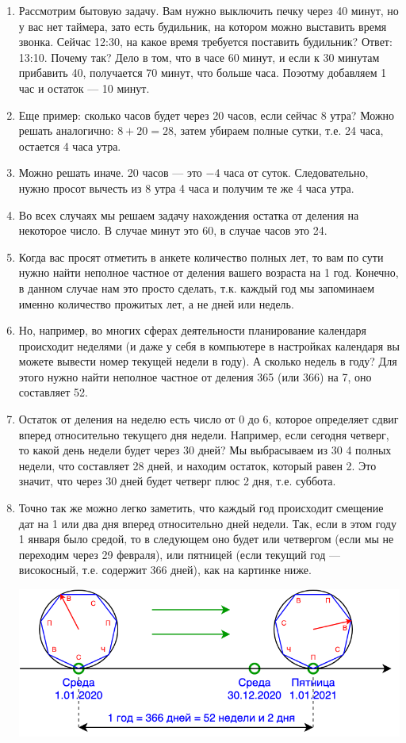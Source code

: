 \begin{enumerate}\setlength{\itemsep}{1pt}
\item Рассмотрим бытовую задачу. Вам нужно выключить печку через 40 минут, но у вас нет таймера, зато есть будильник, на котором можно выставить время звонка. Сейчас 12:30, на какое время требуется поставить будильник? Ответ: 13:10. Почему так? Дело в том, что в часе 60 минут, и если к 30 минутам прибавить 40, получается 70 минут, что больше часа. Поэотму добавляем 1 час и остаток --- 10 минут.
\item Еще пример: сколько часов будет через 20 часов, если сейчас 8 утра? Можно решать аналогично: $8+20=28$, затем убираем полные сутки, т.е. 24 часа, остается 4 часа утра.
\item Можно решать иначе. 20 часов --- это $-4$ часа от суток. Следовательно, нужно просот вычесть из 8 утра 4 часа и получим те же 4 часа утра.
\item Во всех случаях мы решаем задачу нахождения остатка от деления на некоторое число. В случае минут это 60, в случае часов это 24.
\item Когда вас просят отметить в анкете количество полных лет, то вам по сути нужно найти неполное частное от деления вашего возраста на 1 год. Конечно, в данном случае нам это просто сделать, т.к. каждый год мы запоминаем именно количество прожитых лет, а не дней или недель.
\item Но, например, во многих сферах деятельности планирование календаря происходит неделями (и даже у себя в компьютере в настройках календаря вы можете вывести номер текущей недели в году). А сколько недель в году? Для этого нужно найти неполное частное от деления 365 (или 366) на 7, оно составляет 52.
\item Остаток от деления на неделю есть число от 0 до 6, которое определяет сдвиг вперед относительно текущего дня недели. Например, если сегодня четверг, то какой день недели будет через 30 дней? Мы выбрасываем из 30 4 полных недели, что составляет 28 дней, и находим остаток, который равен 2. Это значит, что через 30 дней будет четверг плюс 2 дня, т.е. суббота.
\item Точно так же можно легко заметить, что каждый год происходит смещение дат на 1 или два дня вперед относительно дней недели. Так, если в этом году 1 января было средой, то в следующем оно будет или четвергом (если мы не переходим через 29 февраля), или пятницей (если текущий год --- високосный, т.е. содержит 366 дней), как на картинке ниже.

\begin{center}
\includegraphics[scale=0.4]{weekdays.png}
\end{center}


\end{enumerate}
